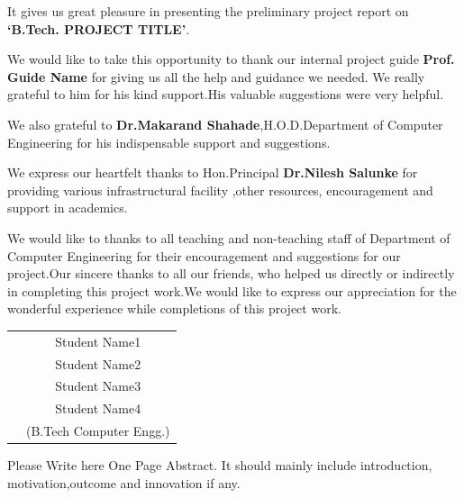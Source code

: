 \documentclass[oneside,a4paper,12pt]{report}
\begin{document}
{  { \setlength{\parindent}{11mm} }
{ \setlength{\parindent}{0mm} }

\textmd{It gives us great pleasure in presenting the preliminary project report 
on {\bfseries \fontsize{12}{12} \selectfont `B.Tech. PROJECT TITLE'}.}
\vspace*{1.5\baselineskip}

 \textmd{We would like to take this opportunity to thank our internal project guide 
 \textbf{Prof. Guide Name} for giving us all the help and guidance we needed. We really grateful to him for his kind support.His valuable suggestions were very helpful.} \vspace*{1.5\baselineskip}

 \textmd{We also grateful to \textbf{Dr.Makarand Shahade},H.O.D.Department of Computer Engineering for his indispensable support and suggestions.}
\vspace*{1.5\baselineskip}

\textmd{We express our heartfelt thanks to Hon.Principal  \textbf{Dr.Nilesh Salunke} for providing various infrastructural facility ,other resources, encouragement and support in academics.}\vspace*{1.5\baselineskip}

\textmd{We would like to thanks to all teaching and non-teaching staff of Department of Computer Engineering for their encouragement and suggestions for our project.Our sincere thanks to all our friends, who helped us directly or indirectly in completing this project work.We would like to express our appreciation for the wonderful experience while completions of this project work.}
\vspace*{3\baselineskip} \\
\begin{tabular}{p{8.2cm}c}
&Student Name1\\
&Student Name2\\
&Student Name3\\
&Student Name4\\
&(B.Tech Computer Engg.)
\end{tabular}
		
{   \setlength{\parindent}{11mm} }
{ \setlength{\parindent}{0mm} }
Please Write here One Page Abstract. It should mainly include introduction, motivation,outcome and innovation if any.






}
\end{document}
